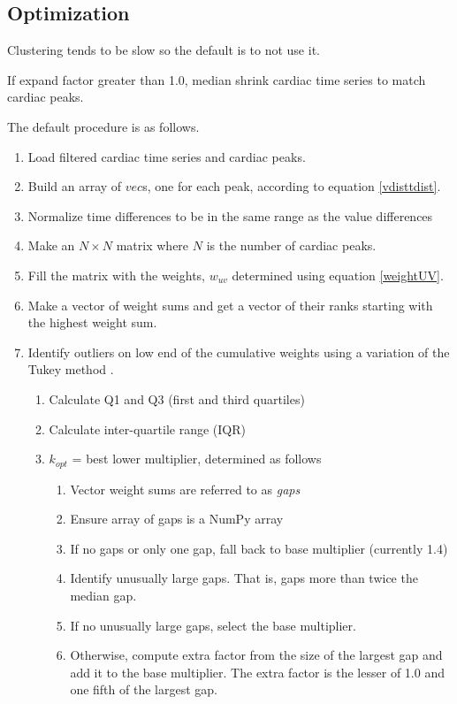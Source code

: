 \documentclass[twoside,twocolumn]{article}
\begin{document}
\subsection{Optimization}

Clustering tends to be slow so the default is to not use it.

If expand factor greater than 1.0, median shrink cardiac time series to match cardiac peaks.

The default procedure is as follows.
\begin{enumerate}
	\item Load filtered cardiac time series and cardiac peaks.
	\item Build an array of $vec$s, one for each peak, according to equation \ref{vdisttdist}.
	\item Normalize time differences to be in the same range as the value differences
	\item Make an $N \times N$ matrix where $N$ is the number of cardiac peaks.
	\item Fill the matrix with the weights, $w_{uv}$ determined using equation \ref{weightUV}.
	\item Make a vector of weight sums and get a vector of their ranks starting with the highest weight sum.
	\item Identify outliers on low end of the cumulative weights using a variation of the Tukey method \cite{Tukey1977}.
	\begin{enumerate}
		\item Calculate Q1 and Q3 (first and third quartiles)
		\item Calculate inter-quartile range (IQR)
		\item $k_{opt}$ = best lower multiplier, determined as follows
		\begin{enumerate}
			\item Vector weight sums are referred to as {\em gaps}
			\item Ensure array of gaps is a NumPy array
			\item If no gaps or only one gap, fall back to base multiplier (currently 1.4)
			\item Identify unusually large gaps.  That is, gaps more than twice the median gap.
			\item If no unusually large gaps, select the base multiplier.
			\item Otherwise, compute extra factor from the size of the largest gap and add it to the base multiplier.  The extra factor is the lesser of 1.0 and one fifth of the largest gap.

\end{enumerate}
\end{enumerate}
\end{enumerate}
\end{document}
